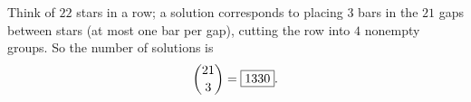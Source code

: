 Think of $22$ stars in a row; a solution corresponds to placing $3$ bars in the $21$ gaps between stars (at most one bar per gap), cutting the row into $4$ nonempty groups. So the number of solutions is
\[
\dbinom{21}{3}=\boxed{1330}.
\]
